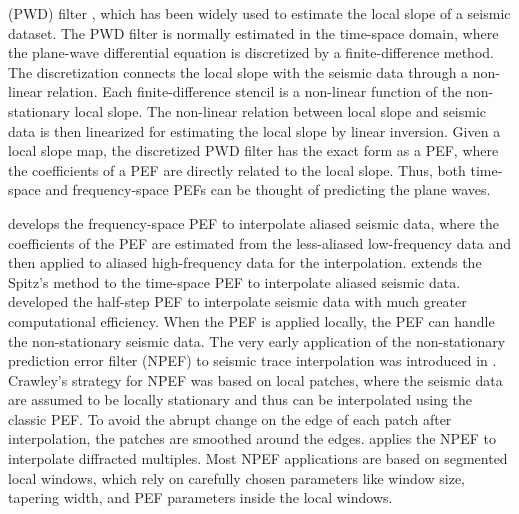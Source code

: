  (PWD) filter \cite[]{fomel2002pwd}, which has been widely used to estimate the local slope of a seismic dataset. The PWD filter is normally estimated in the time-space domain, where the plane-wave differential equation is discretized by a finite-difference method. The discretization connects the local slope with the seismic data through a non-linear relation. Each finite-difference stencil is a non-linear function of the non-stationary local slope. The non-linear relation between local slope and seismic data is then linearized for estimating the local slope by linear inversion. Given a local slope map, the discretized PWD filter has the exact form as a PEF, where the coefficients of a PEF are directly related to the local slope. Thus, both time-space and frequency-space PEFs can be thought of predicting the plane waves. 

 \cite{spitz1991} develops the frequency-space PEF to interpolate aliased seismic data, where the coefficients of the PEF are estimated from the less-aliased low-frequency data and then applied to aliased high-frequency data for the interpolation. \cite{claerbout1992pvi} extends the Spitz's method to the time-space PEF to interpolate aliased seismic data. \cite{porsani1999seismic} developed the half-step PEF to interpolate seismic data with much greater computational efficiency. When the PEF is applied locally, the PEF can handle the non-stationary seismic data. The very early application of the non-stationary prediction error filter (NPEF) to seismic trace interpolation was introduced in \cite{crawley2000seismic}. Crawley's strategy for NPEF was based on local patches, where the seismic data are assumed to be locally stationary and thus can be interpolated using the classic PEF. To avoid the abrupt change on the edge of each patch after interpolation, the patches are smoothed around the edges. \cite{curry2006interpolating} applies the NPEF to interpolate diffracted multiples. Most NPEF applications are based on segmented local windows, which rely on carefully chosen parameters like window size, tapering width, and PEF parameters inside the local windows. 

